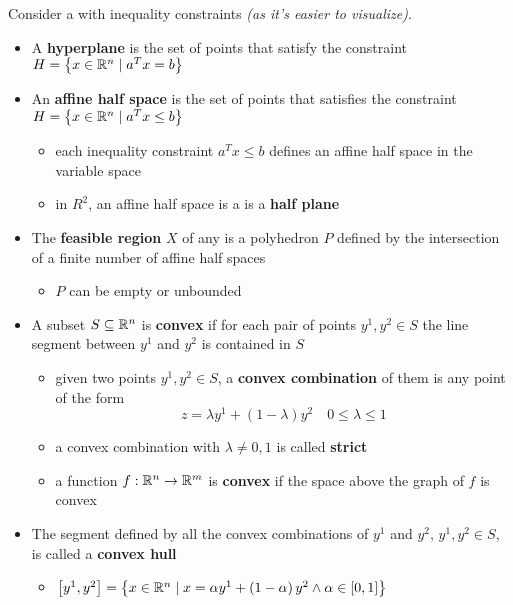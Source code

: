 \documentclass[english]{article}
\begin{document}
\bigskip
Consider a \LP with inequality constraints \textit{(as it's easier to visualize)}.

\begin{itemize}
  \item A \textbf{hyperplane} is the set of points that satisfy the constraint
        \( H = \left\{ x \in \mathbb{R}^n \mid   a^T x = b \right\} \)
  \item An \textbf{affine half space} is the set of points that satisfies the constraint
        \(H = \left\{ x \in \mathbb{R}^n \mid   a^T x \leq b \right\} \)
        \begin{itemize}[label=\(\rightarrow\)]
          \item each inequality constraint \(a^T x \leq b\) defines an affine half space in the variable space
          \item in \(R^2\), an affine half space is a is a \textbf{half plane}
        \end{itemize}
  \item The \textbf{feasible region} \(X\) of any \LP is a polyhedron \(P\) defined by the intersection of a finite number of affine half spaces
        \begin{itemize}[label=\(\rightarrow\)]
          \item \(P\) can be empty or unbounded
        \end{itemize}
  \item A subset \(S \subseteq \mathbb{R}^n\) is \textbf{convex} if for each pair of points \(y^1, y^2 \in S\) the line segment between \(y^1\) and \(y^2\) is contained in \(S\)
        \begin{itemize}[label=\(\rightarrow\)]
          \item given two points \(y^1, y^2 \in S\), a \textbf{convex combination} of them is any point of the form
                \[ z = \lambda y^1 + \left( 1 - \lambda \right) y^2 \quad 0 \leq \lambda \leq 1 \]
          \item a convex combination with \(\lambda \neq 0, 1\) is called \textbf{strict}
          \item a function \(f: \mathbb{R}^n \rightarrow \mathbb{R}^m\) is \textbf{convex} if the space above the graph of \(f\) is convex
        \end{itemize}
  \item The segment defined by all the convex combinations of \(y^1\) and \(y^2\), \(y^1, y^2 \in S\), is called a \textbf{convex hull}
        \begin{itemize}[label=\(\rightarrow\)]
          \item \(\left[ y^1, y^2 \right] = \left\{ x \in \mathbb{R}^n \mid   x = \alpha y^1 + \left( 1-\alpha \right) y^2 \land \alpha \in \left[ 0, 1 \right] \right\}\)

\end{itemize}
\end{itemize}
\end{document}
